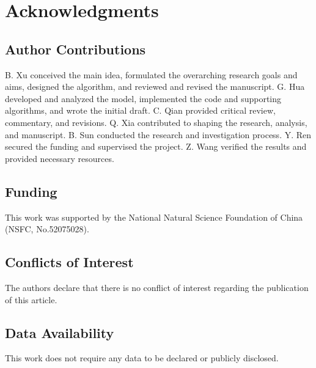 \documentclass{article}
\begin{document}
\section*{Acknowledgments}

\subsection*{Author Contributions} 

B. Xu conceived the main idea, formulated the overarching research goals and aims, designed the algorithm, and reviewed and revised the manuscript.
G. Hua developed and analyzed the model, implemented the code and supporting algorithms, and wrote the initial draft.
C. Qian provided critical review, commentary, and revisions.
Q. Xia contributed to shaping the research, analysis, and manuscript.
B. Sun conducted the research and investigation process.
Y. Ren secured the funding and supervised the project.
Z. Wang verified the results and provided necessary resources.

\subsection*{Funding}

This work was supported by the National Natural Science Foundation of China (NSFC, No.52075028).

\subsection*{Conflicts of Interest}

The authors declare that there is no conflict of interest regarding the publication of this article.

\subsection*{Data Availability}

This work does not require any data to be declared or publicly disclosed.

% 
% 

\printbibliography
\end{document}
